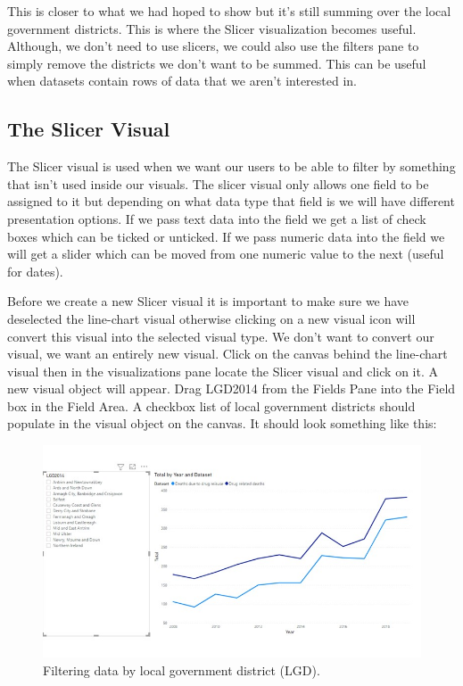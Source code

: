 \documentclass[
]{book}
\begin{document}
This is closer to what we had hoped to show but it's still summing over the local government districts. This is where the Slicer visualization becomes useful. Although, we don't need to use slicers, we could also use the filters pane to simply remove the districts we don't want to be summed. This can be useful when datasets contain rows of data that we aren't interested in.

\hypertarget{the-slicer-visual}{%
\subsection{The Slicer Visual}\label{the-slicer-visual}}

The Slicer visual is used when we want our users to be able to filter by something that isn't used inside our visuals. The slicer visual only allows one field to be assigned to it but depending on what data type that field is we will have different presentation options. If we pass text data into the field we get a list of check boxes which can be ticked or unticked. If we pass numeric data into the field we will get a slider which can be moved from one numeric value to the next (useful for dates).

Before we create a new Slicer visual it is important to make sure we have deselected the line-chart visual otherwise clicking on a new visual icon will convert this visual into the selected visual type. We don't want to convert our visual, we want an entirely new visual. Click on the canvas behind the line-chart visual then in the visualizations pane locate the Slicer visual and click on it. A new visual object will appear. Drag LGD2014 from the Fields Pane into the Field box in the Field Area. A checkbox list of local government districts should populate in the visual object on the canvas. It should look something like this:

\begin{figure}
\centering
\includegraphics{bi8.jpg}
\caption{Filtering data by local government district (LGD).}
\end{figure}
\end{document}
